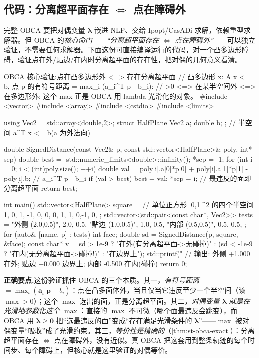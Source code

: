 \subsection{代码：分离超平面存在\texorpdfstring{ $\Leftrightarrow$ }{ <=> }点在障碍外}
\label{sec:st-obca-code}

完整 OBCA 要把对偶变量 $\boldsymbol\lambda$ 嵌进 NLP、交给 Ipopt/CasADi 求解，依赖重型求解器。但 OBCA 的\emph{核心命门——“分离超平面存在 $\Leftrightarrow$ 点在障碍外”}——可以独立验证，不需要任何求解器。下面这份可直接编译运行的代码，对一个凸多边形障碍，验证点在外/贴边/在内时分离超平面的存在性，把对偶的几何意义看清。

\begin{codebox}[C++]{OBCA 核心验证:点在凸多边形外 <=> 存在分离超平面}
// 凸多边形 {x: A x <= b}, 点 p 的有符号距离 = max_i (a_i^T p - b_i):
//   >0 <=> 在某半空间外 <=> 在多边形外; 这个 max 正是 OBCA 用 lambda 光滑化的对象。
#include <vector>
#include <array>
#include <cstdio>
#include <limits>

using Vec2 = std::array<double,2>;
struct HalfPlane { Vec2 a; double b; };          // 半空间 a^T x <= b(a 为外法向)

double SignedDistance(const Vec2& p, const std::vector<HalfPlane>& poly, int* sep) {
  double best = -std::numeric_limits<double>::infinity();
  *sep = -1;
  for (int i = 0; i < (int)poly.size(); ++i) {
    double val = poly[i].a[0]*p[0] + poly[i].a[1]*p[1] - poly[i].b;  // a_i^T p - b_i
    if (val > best) { best = val; *sep = i; }    // 最违反的面即分离超平面
  }
  return best;
}

int main() {
  std::vector<HalfPlane> square = {              // 单位正方形 [0,1]^2 的四个半空间
    {{ 1, 0}, 1}, {{-1, 0}, 0}, {{ 0, 1}, 1}, {{ 0,-1}, 0},
  };
  std::vector<std::pair<const char*, Vec2>> tests = {
    {"外侧 (2.0,0.5)", {2.0, 0.5}},
    {"贴边 (1.0,0.5)", {1.0, 0.5}},
    {"内部 (0.5,0.5)", {0.5, 0.5}},
  };
  for (auto& [name, p] : tests) {
    int face;
    double sd = SignedDistance(p, square, &face);
    const char* v = sd > 1e-9 ? "在外(有分离超平面->无碰撞)"
                  : (sd < -1e-9 ? "在内(无分离超平面->碰撞!)" : "在边界上");
    std::printf("%
  }
  // 输出: 外侧 +1.000 在外; 贴边 +0.000 边界上; 内部 -0.500 在内(碰撞)
  return 0;
}
\end{codebox}

\noindent\textbf{正确要点.}\;这份验证抓住 OBCA 的三个本质。其一，\emph{有符号距离} $=\max_i(\mathbf a_i^\top\mathbf p-b_i)$：点在凸多面体外，当且仅当它违反至少一个半空间（该 $\max>0$）；这个 $\max$ 选出的面，正是分离超平面。其二，\emph{对偶变量 $\boldsymbol\lambda$ 就是在光滑地参数化这个 $\max$}：直接的 $\max$ 不可微（哪个面最违反会跳变），而 OBCA 用 $\boldsymbol\lambda\ge\mathbf 0$ 把“选最违反的面”变成“存在满足光滑条件的 $\boldsymbol\lambda$”——$\max$ 被对偶变量“吸收”成了光滑约束。其三，\emph{等价性是精确的}（\cref{thm:st-obca-exact}）：分离超平面存在 $\Leftrightarrow$ 点在障碍外，没有近似。真 OBCA 把这套用到整条轨迹的每个时间步、每个障碍上，但核心就是这里验证的对偶等价。

